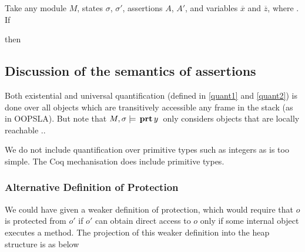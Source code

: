  
  \begin{lemma}
 \label{lemma:lowers}
Take any  module $M$, states $\sigma$, $\sigma'$, assertions $A$, $A'$,  
  and variables $\overline x$ and $\overline z$, where
. If 

 then
\end{lemma}
 


 
 \subsection{Discussion of the semantics of assertions}
 
 {Both existential and universal quantification (defined in \ref{quant1} and \ref{quant2}) is done over all objects which are transitively 
accessible any frame in the stack (as in OOPSLA). But note that $M , \sigma \models {\ensuremath{\, \mathbf{prt}}\, y\, }$ only considers objects that are locally reachable ..

We do not include quantification over primitive types such as integers as \LangOO is too simple. The 
Coq mechanisation does include primitive types.}

\subsubsection{Alternative Definition of Protection}

We could have given a weaker definition of protection, which would require that $o$ is protected from $o'$ if $o'$ can obtain direct access to $o$ only if some internal object executes a method. 
The projection of this weaker definition into the heap structure is as below


